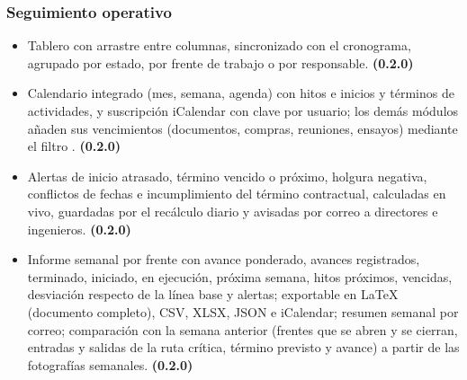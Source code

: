 \documentclass[11pt,a4paper]{article}
\begin{document}
\subsubsection{Seguimiento operativo}
\begin{itemize}
\item Tablero con arrastre entre columnas, sincronizado con el cronograma, agrupado por estado, por frente de trabajo o por responsable. \textbf{(0.2.0)}
\item Calendario integrado (mes, semana, agenda) con hitos e inicios y términos de actividades, y suscripción iCalendar con clave por usuario; los demás módulos añaden sus vencimientos (documentos, compras, reuniones, ensayos) mediante el filtro . \textbf{(0.2.0)}
\item Alertas de inicio atrasado, término vencido o próximo, holgura negativa, conflictos de fechas e incumplimiento del término contractual, calculadas en vivo, guardadas por el recálculo diario y avisadas por correo a directores e ingenieros. \textbf{(0.2.0)}
\item Informe semanal por frente con avance ponderado, avances registrados, terminado, iniciado, en ejecución, próxima semana, hitos próximos, vencidas, desviación respecto de la línea base y alertas; exportable en LaTeX (documento completo), CSV, XLSX, JSON e iCalendar; resumen semanal por correo; comparación con la semana anterior (frentes que se abren y se cierran, entradas y salidas de la ruta crítica, término previsto y avance) a partir de las fotografías semanales. \textbf{(0.2.0)}
\end{itemize}
\end{document}
